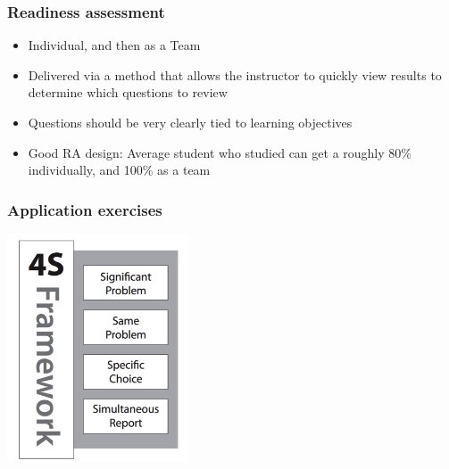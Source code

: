 \documentclass{beamer}
\begin{document}

\begin{frame}
\frametitle{Readiness assessment}

\begin{itemize}

\item Individual, and then as a Team

\item Delivered via a method that allows the instructor to quickly view results to determine which questions to review

\item Questions should be very clearly tied to learning objectives

\item Good RA design: Average student who studied can get a roughly 80\% individually, and 100\% as a team

\end{itemize}

\end{frame}


\begin{frame}
\frametitle{Application exercises}

\begin{center}
\includegraphics[width = 0.4\textwidth]{figures/4s}
\end{center}

\end{frame}

\end{document}
